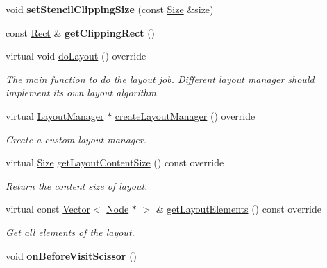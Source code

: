 \begin{DoxyCompactItemize}
\item 
\mbox{\label{classui_1_1Layout_a07666c1edbdba7b1afa3b4ac140ee8c7}} 
void {\bfseries set\+Stencil\+Clipping\+Size} (const \hyperlink{classSize}{Size} \&size)
\item 
\mbox{\label{classui_1_1Layout_a8f140a32ffee81fd0f3820a393b74b8e}} 
const \hyperlink{classRect}{Rect} \& {\bfseries get\+Clipping\+Rect} ()
\item 
\mbox{\label{classui_1_1Layout_a7a999de9278ad289c05cd0abfc409c89}} 
virtual void \hyperlink{classui_1_1Layout_a7a999de9278ad289c05cd0abfc409c89}{do\+Layout} () override
\begin{DoxyCompactList}\small\item\em The main function to do the layout job. Different layout manager should implement its own layout algorithm. \end{DoxyCompactList}\item 
virtual \hyperlink{classui_1_1LayoutManager}{Layout\+Manager} $\ast$ \hyperlink{classui_1_1Layout_a577a2868212962f2da8522f3fc5b81c7}{create\+Layout\+Manager} () override
\begin{DoxyCompactList}\small\item\em Create a custom layout manager. \end{DoxyCompactList}\item 
virtual \hyperlink{classSize}{Size} \hyperlink{classui_1_1Layout_a982a59e5b4697183b4899721842cd3a5}{get\+Layout\+Content\+Size} () const override
\begin{DoxyCompactList}\small\item\em Return the content size of layout. \end{DoxyCompactList}\item 
virtual const \hyperlink{classVector}{Vector}$<$ \hyperlink{classNode}{Node} $\ast$ $>$ \& \hyperlink{classui_1_1Layout_a832b7950870e62e045456b7565db924d}{get\+Layout\+Elements} () const override
\begin{DoxyCompactList}\small\item\em Get all elements of the layout. \end{DoxyCompactList}\item 
\mbox{\label{classui_1_1Layout_abfbda1edc76f947f99ab46ce225d9559}} 
void {\bfseries on\+Before\+Visit\+Scissor} ()

\end{DoxyCompactItemize}
